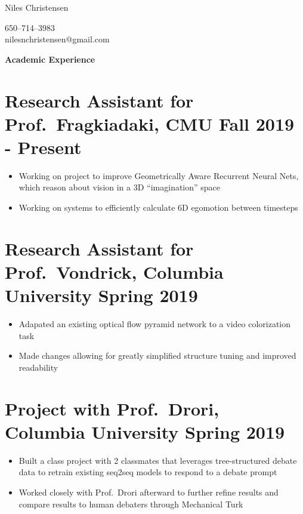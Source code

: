 \documentclass{article}
\newenvironment{tightcenter}{%
  \setlength\topsep{0pt}
  \setlength\parskip{0pt}
  \begin{center}
}{%
  \end{center}
}
\begin{document}
\begin{tightcenter}
\begin{Large}Niles Christensen\\
\end{Large}
\begin{small}
650--714--3983\\
nilesnchristensen@gmail.com
\end{small}
\end{tightcenter}

\noindent
\large{\textbf{Academic Experience}}

\section*{\textbf{Research Assistant for Prof.\ Fragkiadaki, CMU \hfill Fall 2019 - Present}}
\begin{itemize}[noitemsep]
  \item Working on project to improve Geometrically Aware Recurrent Neural Nets, which reason about vision in a 3D ``imagination'' space
  \item Working on systems to efficiently calculate 6D egomotion between timesteps
\end{itemize}

\section*{\textbf{Research Assistant for Prof.\ Vondrick, Columbia University \hfill	Spring 2019}}
\begin{itemize}[noitemsep]
    \item Adapated an existing optical flow pyramid network to a video colorization task
    \item Made changes allowing for greatly simplified structure tuning and improved readability
\end{itemize}

\section*{\textbf{Project with Prof.\ Drori, Columbia University \hfill Spring 2019}}
\begin{itemize}[noitemsep]
  \item Built a class project with 2 classmates that leverages tree-structured debate data to retrain existing seq2seq models to respond to a debate prompt
  \item Worked closely with Prof.\ Drori afterward to further refine results and compare results to human debaters through Mechanical Turk
\end{itemize}
\end{document}
